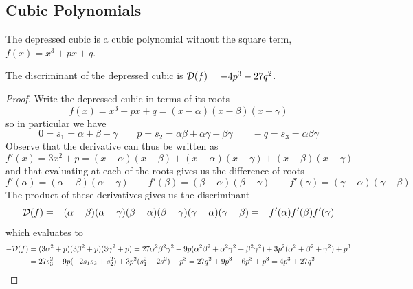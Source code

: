 \subsection*{Cubic Polynomials}

\begin{definition}
    The depressed cubic is a cubic polynomial without the square term, \(f(x) = x^3 + px + q\).
\end{definition}
\begin{proposition}\label{prop:discriminant-cubic}
    The discriminant of the depressed cubic is \(\mathcal{D}(f) = -4p^3 - 27q^2\).
\end{proposition}
\begin{proof}
    Write the depressed cubic in terms of its roots
    \[f(x) = x^3 + px + q = (x-\alpha)(x-\beta)(x-\gamma)\]
    so in particular we have
    \[0 = s_1 = \alpha + \beta + \gamma \qquad p = s_2 = \alpha\beta + \alpha\gamma + \beta\gamma \qquad -q = s_3 = \alpha\beta\gamma\]
    Observe that the derivative can thus be written as
    \[f'(x) = 3x^2 + p = (x-\alpha)(x-\beta) + (x-\alpha)(x-\gamma) + (x-\beta)(x-\gamma)\]
    and that evaluating at each of the roots gives us the difference of roots
    \begin{equation*}
        f'(\alpha) = (\alpha-\beta)(\alpha-\gamma) \qquad
        f'(\beta) = (\beta-\alpha)(\beta-\gamma) \qquad
        f'(\gamma) = (\gamma-\alpha)(\gamma-\beta)
    \end{equation*}
    The product of these derivatives gives us the discriminant
    \begin{equation*}
        \mathcal{D}(f) = -(\alpha-\beta)(\alpha-\gamma)(\beta-\alpha)(\beta-\gamma)(\gamma-\alpha)(\gamma-\beta)
        = -f'(\alpha)f'(\beta)f'(\gamma)
    \end{equation*}
    which evaluates to
    \begin{align*}
        -\mathcal{D}(f) &= (3\alpha^2+p)(3\beta^2+p)(3\gamma^2+p)
        = 27\alpha^2\beta^2\gamma^2 + 9p(\alpha^2\beta^2+\alpha^2\gamma^2+\beta^2\gamma^2) + 3p^2(\alpha^2+\beta^2+\gamma^2) + p^3 \\
        &= 27s_3^2 + 9p(-2s_1s_3 + s_2^2) + 3p^2(s_1^2 - 2s^2) + p^3
        = 27q^2 + 9p^3 - 6p^3 + p^3 = 4p^3 + 27q^2
    \end{align*}
\end{proof}

